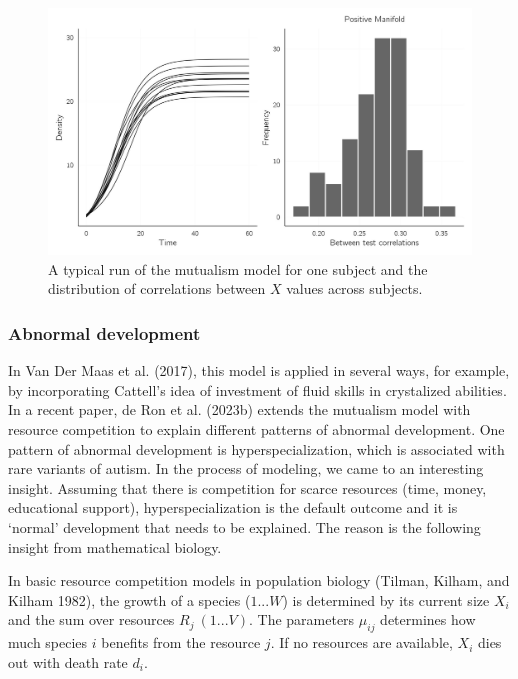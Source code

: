 \documentclass[
  a4paper,
  DIV=11,
  numbers=noendperiod]{scrreprt}
\begin{document}
\begin{figure}

{\centering \includegraphics{media/ch6/fig-ch6-img7-old-76.jpg}

}

\caption{\label{fig-ch6-img7-old-76}A typical run of the mutualism model
for one subject and the distribution of correlations between \(X\)
values across subjects.}

\end{figure}

\hypertarget{sec-Abnormal-development}{%
\subsubsection{Abnormal development}\label{sec-Abnormal-development}}

In Van Der Maas et al. (2017), this model is applied in several ways,
for example, by incorporating Cattell's idea of investment of fluid
skills in crystalized abilities. In a recent paper, de Ron et al.
(2023b) extends the mutualism model with resource competition to explain
different patterns of abnormal development. One pattern of abnormal
development is hyperspecialization, which is associated with rare
variants of autism. In the process of modeling, we came to an
interesting insight. Assuming that there is competition for scarce
resources (time, money, educational support), hyperspecialization is the
default outcome and it is `normal' development that needs to be
explained. The reason is the following insight from mathematical
biology.

In basic resource competition models in population biology (Tilman,
Kilham, and Kilham 1982), the growth of a species (\(1...W\)) is
determined by its current size \(X_{i}\) and the sum over resources
\(R_{j}\ (1...V)\). The parameters \(\mu_{ij}\) determines how much
species \(i\) benefits from the resource \(j\). If no resources are
available, \(X_{i}\) dies out with death rate \(d_{i}\).
\end{document}
